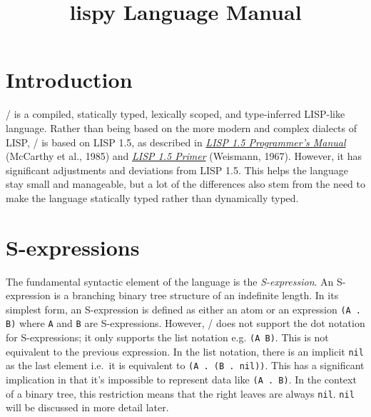 \documentclass[a4paper, 12pt]{article}
\title{lispy Language Manual}
\begin{document}
\maketitle
{
\hypersetup{linkcolor=black}
\tableofcontents
}

\newpage
\section{Introduction}
\lispy/ is a compiled, statically typed, lexically scoped, and type-inferred LISP-like language. Rather than being based on the more modern and complex dialects of LISP, \lispy/ is based on LISP 1.5, as described in \href{https://www.lispmachine.net/books/LISP_1.5_Programmers_Manual.pdf}{\textit{LISP 1.5 Programmer's Manual}} (McCarthy et al., 1985) and \href{http://www.softwarepreservation.org/projects/LISP/book/Weismann_LISP1.5_Primer_1967.pdf}{\textit{LISP 1.5 Primer}} (Weismann, 1967). However, it has significant adjustments and deviations from LISP 1.5. This helps the language stay small and manageable, but a lot of the differences also stem from the need to make the language statically typed rather than dynamically typed.

\section{S-expressions}
The fundamental syntactic element of the language is the \textit{S-expression}. An S-expression is a branching binary tree structure of an indefinite length. In its simplest form, an S-expression is defined as either an atom or an expression \texttt{(A . B)} where \texttt{A} and \texttt{B} are S-expressions. However, \lispy/ does not support the dot notation for S-expressions; it only supports the list notation e.g. \texttt{(A B)}. This is not equivalent to the previous expression. In the list notation, there is an implicit \texttt{nil} as the last element i.e.\ it is equivalent to \texttt{(A . (B . nil))}. This has a significant implication in that it's impossible to represent data like \texttt{(A . B)}. In the context of a binary tree, this restriction means that the right leaves are always \texttt{nil}. \texttt{nil} will be discussed in more detail later.
\end{document}

